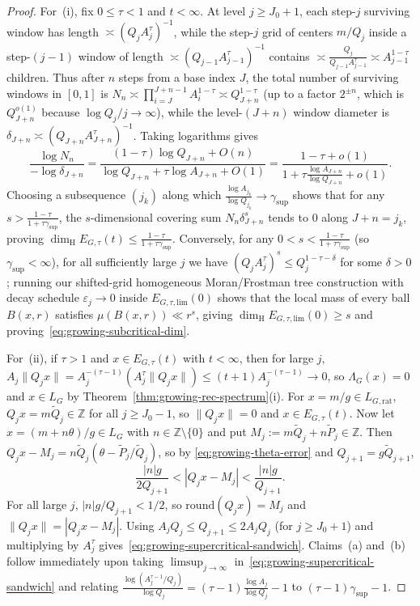 \documentclass[11pt]{article}
\theoremstyle{definition}
\theoremstyle{remark}
\newcommand{\Z}{\mathbb{Z}}
\newcommand{\dimH}{\dim_{\mathrm{H}}}
\newcommand{\Lam}{\Lambda}
\begin{document}
\begin{proof}
For~(i), fix $0\le\tau<1$ and $t<\infty$. At level $j\ge J_0+1$, each step-$j$
surviving window has length $\asymp(Q_j A_j^\tau)^{-1}$, while the step-$j$ grid
of centers $m/Q_j$ inside a step-$(j-1)$ window of length $\asymp(Q_{j-1}A_{j-1}^\tau)^{-1}$
contains $\asymp\frac{Q_j}{Q_{j-1}A_{j-1}^\tau}\asymp A_{j-1}^{1-\tau}$ children.
Thus after $n$ steps from a base index $J$, the total number of surviving windows
in $[0,1]$ is $N_n\asymp\prod_{i=J}^{J+n-1}A_i^{1-\tau}\asymp Q_{J+n}^{1-\tau}$
(up to a factor $2^{\pm n}$, which is $Q_{J+n}^{o(1)}$ because $\log Q_j/j\to\infty$),
while the level-$(J+n)$ window diameter is $\delta_{J+n}\asymp(Q_{J+n}A_{J+n}^\tau)^{-1}$.
Taking logarithms gives
\[
\frac{\log N_n}{-\log\delta_{J+n}}
=\frac{(1-\tau)\log Q_{J+n}+O(n)}{\log Q_{J+n}+\tau\log A_{J+n}+O(1)}
=\frac{1-\tau+o(1)}{1+\tau\frac{\log A_{J+n}}{\log Q_{J+n}}+o(1)}.
\]
Choosing a subsequence $(j_k)$ along which $\frac{\log A_{j_k}}{\log Q_{j_k}}\to\gamma_{\sup}$
shows that for any $s>\frac{1-\tau}{1+\tau\gamma_{\sup}}$, the $s$-dimensional
covering sum $N_n\delta_{J+n}^s$ tends to $0$ along $J+n=j_k$, proving
$\dimH E_{G,\tau}(t)\le\frac{1-\tau}{1+\tau\gamma_{\sup}}$. Conversely, for any
$0<s<\frac{1-\tau}{1+\tau\gamma_{\sup}}$ (so $\gamma_{\sup}<\infty$), for all
sufficiently large $j$ we have $(Q_j A_j^\tau)^s\le Q_j^{1-\tau-\delta}$ for some
$\delta>0$; running our shifted-grid homogeneous Moran/Frostman tree construction
with decay schedule $\varepsilon_j\to0$ inside $E_{G,\tau,\mathrm{lim}}(0)$ shows
that the local mass of every ball $B(x,r)$ satisfies $\mu(B(x,r))\ll r^s$, giving
$\dimH E_{G,\tau,\mathrm{lim}}(0)\ge s$ and proving~\eqref{eq:growing-subcritical-dim}.

For~(ii), if $\tau>1$ and $x\in E_{G,\tau}(t)$ with $t<\infty$, then for large $j$,
$A_j\|Q_j x\|=A_j^{-(\tau-1)}(A_j^\tau\|Q_j x\|)\le(t+1)A_j^{-(\tau-1)}\to0$, so
$\Lam_G(x)=0$ and $x\in L_G$ by Theorem~\ref{thm:growing-rec-spectrum}(i). For
$x=m/g\in L_{G,\mathrm{rat}}$, $Q_j x=m\widetilde Q_j\in\Z$ for all $j\ge J_0-1$,
so $\|Q_j x\|=0$ and $x\in E_{G,\tau}(t)$. Now let $x=(m+n\theta)/g\in L_G$ with
$n\in\Z\setminus\{0\}$ and put $M_j:=m\widetilde Q_j+n\widetilde P_j\in\Z$. Then
$Q_j x-M_j=n\widetilde Q_j(\theta-\widetilde P_j/\widetilde Q_j)$, so by
\eqref{eq:growing-theta-error} and $Q_{j+1}=g\widetilde Q_{j+1}$,
\[
\frac{|n|g}{2 Q_{j+1}}
<|Q_j x-M_j|
<\frac{|n|g}{Q_{j+1}}.
\]
For all large $j$, $|n|g/Q_{j+1}<1/2$, so $\mathrm{round}(Q_j x)=M_j$ and
$\|Q_j x\|=|Q_j x-M_j|$. Using $A_j Q_j\le Q_{j+1}\le 2 A_j Q_j$ (for $j\ge J_0+1$)
and multiplying by $A_j^\tau$ gives~\eqref{eq:growing-supercritical-sandwich}.
Claims~(a) and~(b) follow immediately upon taking $\limsup_{j\to\infty}$ in~\eqref{eq:growing-supercritical-sandwich}
and relating $\frac{\log(A_j^{\tau-1}/Q_j)}{\log Q_j}=(\tau-1)\frac{\log A_j}{\log Q_j}-1$
to $(\tau-1)\gamma_{\sup}-1$.
\end{proof}
\end{document}
